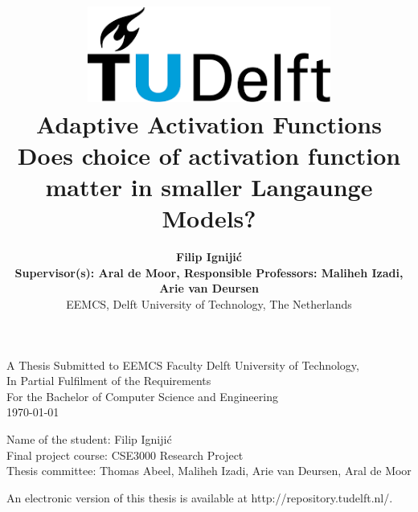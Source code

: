 \title{
    \includegraphics[width=8cm, keepaspectratio]{tudelftlogo.png}\\
    \vspace*{2cm}
    \textbf{
         Adaptive Activation Functions\\
        {\large Does choice of activation function matter in smaller Langaunge Models?}
    }\\
    \vspace*{1cm}
}

\author{
     \textbf{Filip Ignijić}\\
    \hfill \break
    \textbf{Supervisor(s): Aral de Moor, Responsible Professors: Maliheh Izadi, Arie van Deursen}\\
    \break
    {\large 
        \hfill \break
        EEMCS, Delft University of Technology, The Netherlands
    }\\
}

\date{}

\maketitle
\thispagestyle{empty}

\let\clearpagebackup\clearpage
\renewcommand{\clearpage}{ }

\onecolumn

\vspace*{1.5cm}
\begin{center}
    A Thesis Submitted to EEMCS Faculty Delft University of Technology,\\
    In Partial Fulfilment of the Requirements\\
    For the Bachelor of Computer Science and Engineering\\
    \today
\end{center}

\vspace*{2cm}

\noindent
{\small
Name of the student: Filip Ignijić\\
Final project course: CSE3000 Research Project\\
Thesis committee: Thomas Abeel, Maliheh Izadi, Arie van Deursen, Aral de Moor \\
}
\vfill

\begin{center}
    An electronic version of this thesis is available at http://repository.tudelft.nl/.
\end{center}

\twocolumn
\let\clearpage\clearpagebackup  
\clearpage
\setcounter{page}{1}
